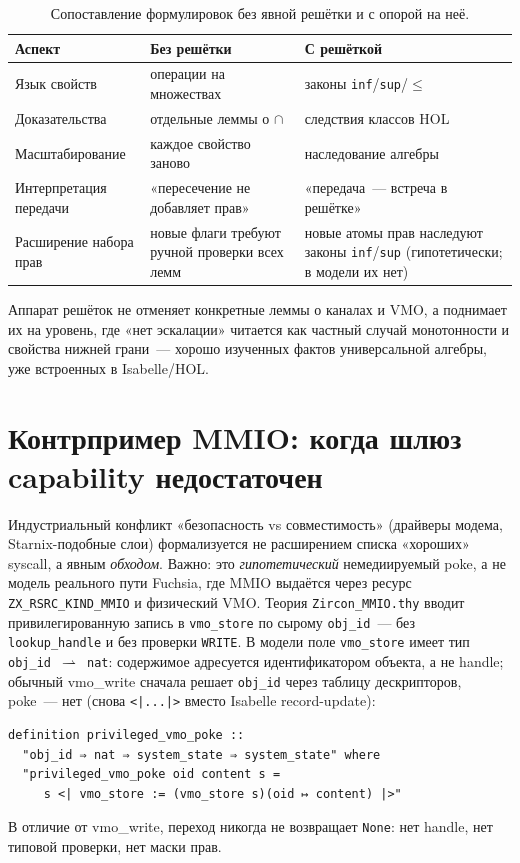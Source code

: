 \documentclass[11pt,a4paper]{article}
\newcommand{\isabel}[1]{{\isabelleit #1}}
\newcommand{\lemmaname}[1]{\isabel{#1}}
\begin{document}
\begin{table}[ht]
	\centering
	\caption{Сопоставление формулировок без явной решётки и с опорой на неё.}
	\label{tab:lattice}
	\begin{tabular}{@{}p{}p{}p{}@{}}
		\toprule
		\textbf{Аспект}                 &
		\textbf{Без решётки}            &
		\textbf{С решёткой}                    \\
		\midrule
		Язык свойств                    &
		операции на множествах          &
		законы \texttt{inf}/\texttt{sup}/$\le$ \\
		Доказательства                  &
		отдельные леммы о $\cap$        &
		следствия классов HOL                  \\
		Масштабирование                 &
		каждое свойство заново          &
		наследование алгебры                   \\
		Интерпретация передачи          &
		«пересечение не добавляет прав» &
		«передача~--- встреча в решётке»       \\
		Расширение набора прав          &
		новые флаги требуют ручной
		проверки всех лемм              &
		новые атомы прав наследуют
		законы \texttt{inf}/\texttt{sup}
		(гипотетически; в модели их нет)       \\
		\bottomrule
	\end{tabular}
\end{table}

Аппарат решёток не отменяет конкретные леммы о каналах и VMO, а
поднимает их на уровень, где «нет эскалации» читается как частный случай
монотонности и свойства нижней грани~--- хорошо изученных фактов
универсальной алгебры, уже встроенных в Isabelle/HOL.

\section{Контрпример MMIO: когда шлюз \textenglish{capability} недостаточен}

Индустриальный конфликт «безопасность vs совместимость» (драйверы модема,
Starnix-подобные слои) формализуется не расширением списка «хороших»
syscall, а явным \emph{обходом}. Важно: это \emph{гипотетический}
немедиируемый poke, а не модель реального пути Fuchsia, где MMIO
выдаётся через ресурс \texttt{ZX\_RSRC\_KIND\_MMIO} и физический VMO.
Теория \texttt{Zircon\_MMIO.thy} вводит
привилегированную запись в \texttt{vmo\_store} по сырому
\texttt{obj\_id}~--- без \texttt{lookup\_handle} и без проверки
\texttt{WRITE}. В модели поле \texttt{vmo\_store} имеет тип
\texttt{obj\_id $\rightharpoonup$ nat}: содержимое адресуется идентификатором
объекта, а не handle; обычный \lemmaname{vmo\_write} сначала решает
\texttt{obj\_id} через таблицу дескрипторов, poke~--- нет (снова
\texttt{<|...|>} вместо Isabelle record-update):
\begin{lstlisting}
definition privileged_vmo_poke ::
  "obj_id ⇒ nat ⇒ system_state ⇒ system_state" where
  "privileged_vmo_poke oid content s =
     s <| vmo_store := (vmo_store s)(oid ↦ content) |>"
\end{lstlisting}
В отличие от \lemmaname{vmo\_write}, переход никогда не возвращает
\texttt{None}: нет handle, нет типовой проверки, нет маски прав.
\end{document}
